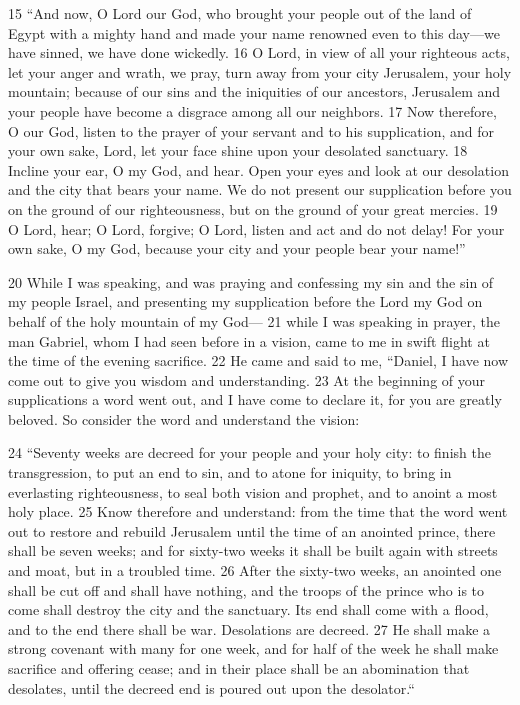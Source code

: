 15 ``And now, O Lord our God, who brought your people out of the land of Egypt 
with a mighty hand and made your name renowned even to this day---we have sinned, 
we have done wickedly. 16 O Lord, in view of all your righteous acts, let your 
anger and wrath, we pray, turn away from your city Jerusalem, your holy 
mountain; because of our sins and the iniquities of our ancestors, Jerusalem and 
your people have become a disgrace among all our neighbors. 17 Now therefore, O 
our God, listen to the prayer of your servant and to his supplication, and for 
your own sake, Lord, let your face shine upon your desolated sanctuary. 18 
Incline your ear, O my God, and hear. Open your eyes and look at our desolation 
and the city that bears your name. We do not present our supplication before 
you on the ground of our righteousness, but on the ground of your great mercies.
19 O Lord, hear; O Lord, forgive; O Lord, listen and act and do not delay! For 
your own sake, O my God, because your city and your people bear your name!''

20 While I was speaking, and was praying and confessing my sin and the sin of my 
people Israel, and presenting my supplication before the Lord my God on behalf 
of the holy mountain of my God--- 21 while I was speaking in prayer, the man 
Gabriel, whom I had seen before in a vision, came to me in swift flight at the 
time of the evening sacrifice. 22 He came and said to me, ``Daniel, I have now 
come out to give you wisdom and understanding. 23 At the 
beginning of your 
supplications a word went out, and I have come to declare it, for you are 
greatly beloved. So consider the word and understand the vision:

24 ``Seventy weeks are decreed for your people and your holy city: to finish 
the transgression, to put an end to sin, and to atone for iniquity, to bring in 
everlasting righteousness, to seal both vision and prophet, and to anoint a most 
holy place. 25 Know therefore and understand: from the time that the word went 
out to restore and rebuild Jerusalem until the time of an anointed prince, 
there shall be seven weeks; and for sixty-two weeks it shall be built again with 
streets and moat, but in a troubled time. 26 After the sixty-two weeks, an 
anointed one shall be cut off and shall have nothing, and the troops of the 
prince who is to come shall destroy the city and the sanctuary. Its end shall 
come with a flood, and to the end there shall be war. Desolations are decreed.
27 He shall make a strong covenant with many for one week, and for half of the 
week he shall make sacrifice and offering cease; and in their place shall be an 
abomination that desolates, until the decreed end is poured out upon the 
desolator.``
